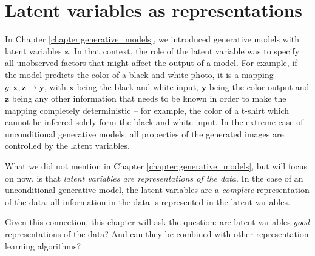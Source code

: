 \section{Latent variables as representations}

In Chapter \ref{chapter:generative_models}, we introduced generative models with latent variables $\mathbf{z}$. In that context, the role of the latent variable was to specify all unobserved factors that might affect the output of a model. For example, if the model predicts the color of a black and white photo, it is a mapping $g: \mathbf{x}, \mathbf{z} \rightarrow \mathbf{y}$, with $\mathbf{x}$ being the black and white input, $\mathbf{y}$ being the color output and $\mathbf{z}$ being any other information that needs to be known in order to make the mapping completely deterministic -- for example, the color of a t-shirt which cannot be inferred solely form the black and white input. In the extreme case of unconditional generative models, all properties of the generated images are controlled by the latent variables.

What we did not mention in Chapter \ref{chapter:generative_models}, but will focus on now, is that \textit{latent variables are representations of the data}. In the case of an unconditional generative model, the latent variables are a \textit{complete} representation of the data: all information in the data is represented in the latent variables.

Given this connection, this chapter will ask the question: are latent variables \textit{good} representations of the data? And can they be combined with other representation learning algorithms?



